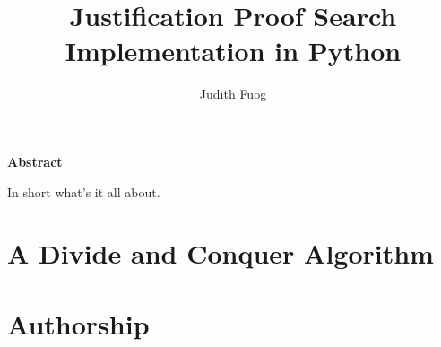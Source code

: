 \documentclass[a4paper]{report}
\begin{document}
\pagestyle{fancyplain} \thispagestyle{empty}

\title{Justification Proof Search Implementation in Python}
\author{Judith Fuog}


 \setcounter{page}{1}
\maketitle

\newpage
\thispagestyle{empty}
\vspace{8cm}
\noindent
{\centerline {\bf \large Abstract}}
\vspace{1cm}

\noindent In short what's it all about.

 \setcounter{page}{1}
\tableofcontents

%
%
%

\newpage{\pagestyle{empty} \cleardoublepage}

 \setcounter{page}{1}
\pagestyle{fancy}




\newpage{\pagestyle{empty} \cleardoublepage}
\chapter{A Divide and Conquer Algorithm}
\label{chap: Algorithm A Divide and Conquer Approach}






%
%
%



\newpage{\pagestyle{empty} \cleardoublepage}




\nocite{*}


\newpage{\pagestyle{empty} \cleardoublepage}
\chapter*{Authorship}
\listoftodos
\end{document}
